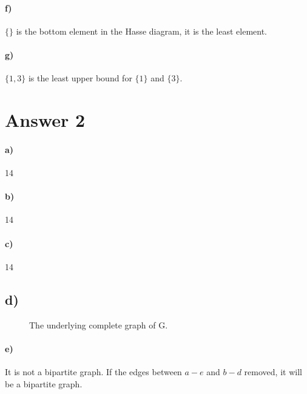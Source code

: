 \documentclass[12pt]{article}
\begin{document}
\paragraph*{f)}
$\{\}$ is the bottom element in the Hasse diagram, it is the least element.

\paragraph*{g)}
$\{1,3\}$ is the least upper bound for $\{1\}$ and $\{3\}$.


\newpage


\section*{Answer 2}
\paragraph{a)}
14
\paragraph{b)}
14
\paragraph*{c)}
14
\subsection*{d)}
\begin{figure}[H]
	\centering
	
	\caption{The underlying complete graph of G.}	
	\label{fig:t2}
\end{figure}

\paragraph*{e)} It is not a bipartite graph. If the edges between $a-e$ and $b-d$ removed, it will be a bipartite graph.
\end{document}
